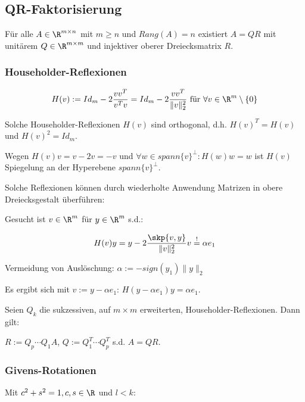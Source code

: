 \subsection*{QR-Faktorisierung}

Für alle $A \in \R^{m \times n}$ mit $m \geq n$ und $Rang(A)=n$ existiert $A=QR$ mit unitärem $Q \in \R^{m \times m}$ und injektiver oberer Dreiecksmatrix $R$.

\subsubsection*{Householder-Reflexionen}

$$H(v) := Id_m - 2 \frac{vv^T}{v^Tv} = Id_m - 2 \frac{vv^T}{\|v\|_2^2} \text{ für } \forall v \in \R^m \setminus \{0\}$$

Solche Householder-Reflexionen $H(v)$ sind orthogonal, d.h. $H(v)^T=H(v)$ und $H(v)^2=Id_m$.

Wegen $H(v)v=v-2v=-v$ und $\forall w \in spann\{v\}^\perp : H(w)w=w$ ist $H(v)$ Spiegelung an der Hyperebene $spann\{v\}^\perp$.

Solche Reflexionen können durch wiederholte Anwendung Matrizen in obere Dreiecksgestalt überführen:

\vspace{1mm}

Gesucht ist $v \in \R^m$ für $y \in \R^m$ s.d.:

\vspace{-2mm}
$$H(v)y=y - 2 \frac{\skp{v,y}}{\|v\|_2^2}v \overset{!}{=} \alpha e_1$$

Vermeidung von Auslöschung: $\alpha := -sign(y_1)\|y\|_2$

Es ergibt sich mit $v:=y-\alpha e_1$: $H(y-\alpha e_1)y=\alpha e_1$.

\vspace{1mm}

Seien $Q_k$ die sukzessiven, auf $m \times m$ erweiterten, Householder-Reflexionen. Dann gilt:

\vspace{1mm}

$R:=Q_p \cdots Q_1 A$, $Q:=Q_1^T \cdots Q_p^T$ s.d. $A=QR$.

\subsubsection*{Givens-Rotationen}

Mit $c^2 + s^2 = 1, c, s \in \R$ und $l < k$:

